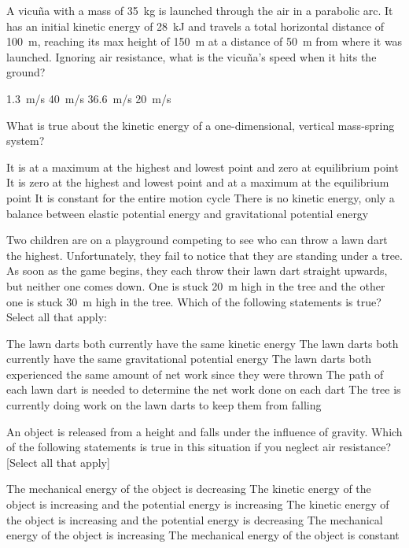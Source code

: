 \question A vicu\~na with a mass of \SI{35}{kg} is launched through the air in a parabolic arc. It has an initial kinetic energy of \SI{28}{kJ} and travels a total horizontal distance of \SI{100}{m}, reaching its max height of \SI{150}{m} at a distance of \SI{50}{m} from where it was launched. Ignoring air resistance, what is the vicu\~na's speed when it hits the ground?
\begin{checkboxes}
\choice \SI{1.3}{m/s}
\CorrectChoice \SI{40}{m/s} \correct
\choice \SI{36.6}{m/s}
\choice \SI{20}{m/s}
\end{checkboxes}


\question What is true about the kinetic energy of a one-dimensional, vertical mass-spring system?
\begin{checkboxes}
\choice It is at a maximum at the highest and lowest point and zero at equilibrium point
\CorrectChoice It is zero at the highest and lowest point and at a maximum at the equilibrium point \correct
\choice It is constant for the entire motion cycle
\choice There is no kinetic energy, only a balance between elastic potential energy and gravitational potential energy
\end{checkboxes}

\question Two children are on a playground competing to see who can throw a lawn dart the highest. Unfortunately, they fail to notice that they are standing under a tree. As soon as the game begins, they each throw their lawn dart straight upwards, but neither one comes down. One is stuck \SI{20}{m} high in the tree and the other one is stuck \SI{30}{m} high in the tree. Which of the following statements is true? Select all that apply:
\begin{checkboxes}
\CorrectChoice The lawn darts both currently have the same kinetic energy \correct
\choice The lawn darts both currently have the same gravitational potential energy
\choice The lawn darts both experienced the same amount of net work since they were thrown
\CorrectChoice The path of each lawn dart is needed to determine the net work done on each dart \correct
\choice The tree is currently doing work on the lawn darts to keep them from falling
\end{checkboxes}

\question An object is released from a height and falls under the influence of gravity. Which of the following statements is true in this situation if you neglect air resistance? [Select all that apply]
\begin{checkboxes}
\choice The mechanical energy of the object is decreasing
\choice The kinetic energy of the object is increasing and the potential energy is increasing
\CorrectChoice The kinetic energy of the object is increasing and the potential energy is decreasing \correct
\choice The mechanical energy of the object is increasing
\CorrectChoice The mechanical energy of the object is constant \correct
\end{checkboxes}


